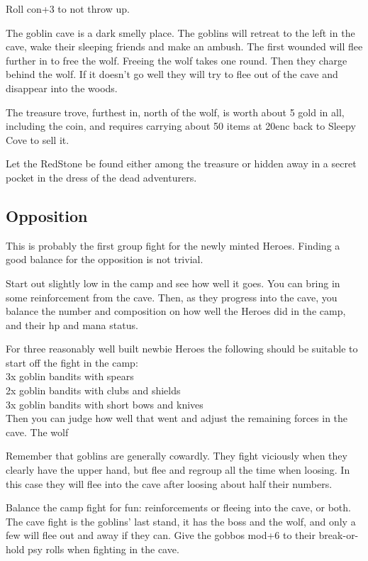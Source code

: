 \documentclass[11pt, twoside, titlepage, a4paper]{report}
\begin{document}
Roll con+3 to not throw up.

The goblin cave is a dark smelly place.
The goblins will retreat to the left in the cave, wake their sleeping friends and make an ambush. The first wounded will flee further in to free the wolf. Freeing the wolf takes one round. Then they charge behind the wolf. If it doesn't go well they will try to flee out of the cave and disappear into the woods.

The treasure trove, furthest in, north of the wolf, is worth about 5 gold in all, including the coin, and requires carrying about 50 items at 20enc back to Sleepy Cove to sell it.

Let the RedStone be found either among the treasure or hidden away in a secret pocket in the dress of the dead adventurers.


\subsection*{Opposition}
This is probably the first group fight for the newly minted Heroes. Finding a good balance for the opposition is not trivial.

Start out slightly low in the camp and see how well it goes. You can bring in some reinforcement from the cave.
Then, as they progress into the cave, you balance the number and composition on how well the Heroes did in the camp, and their hp and mana status.

For three reasonably well built newbie Heroes the following should be suitable to start off the fight in the camp:\\
3x goblin bandits with spears\\
2x goblin bandits with clubs and shields\\
3x goblin bandits with short bows and knives\\
Then you can judge how well that went and adjust the remaining forces in the cave. The wolf

Remember that goblins are generally cowardly. They fight viciously when they clearly have the upper hand, but flee and regroup all the time when loosing. In this case they will flee into the cave after loosing about half their numbers.

Balance the camp fight for fun: reinforcements or fleeing into the cave, or both. The cave fight is the goblins' last stand, it has the boss and the wolf, and only a few will flee out and away if they can. Give the gobbos mod+6 to their break-or-hold psy rolls when fighting in the cave.
\end{document}
